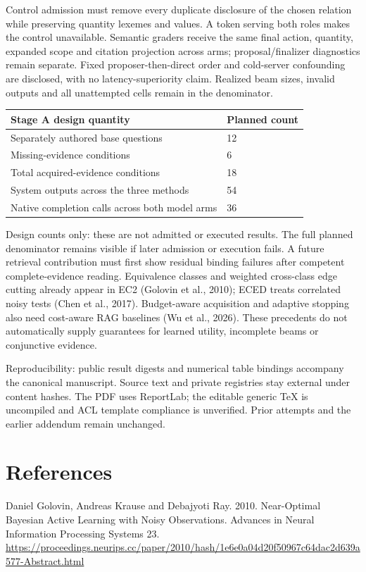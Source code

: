 \documentclass[10pt,a4paper]{article}
\begin{document}
Control admission must remove every duplicate disclosure of the chosen relation while preserving quantity lexemes and values. A token serving both roles makes the control unavailable. Semantic graders receive the same final action, quantity, expanded scope and citation projection across arms; proposal/finalizer diagnostics remain separate. Fixed proposer-then-direct order and cold-server confounding are disclosed, with no latency-superiority claim. Realized beam sizes, invalid outputs and all unattempted cells remain in the denominator.

\begin{longtable}{@{}p{}p{}@{}}\toprule
\textbf{Stage A design quantity} & \textbf{Planned count} \\ \midrule\endhead
Separately authored base questions & 12 \\
Missing-evidence conditions & 6 \\
Total acquired-evidence conditions & 18 \\
System outputs across the three methods & 54 \\
Native completion calls across both model arms & 36 \\
\bottomrule\end{longtable}
{\small Design counts only: these are not admitted or executed results. The full planned denominator remains visible if later admission or execution fails.}
A future retrieval contribution must first show residual binding failures after competent complete-evidence reading. Equivalence classes and weighted cross-class edge cutting already appear in EC2 (Golovin et al., 2010); ECED treats correlated noisy tests (Chen et al., 2017). Budget-aware acquisition and adaptive stopping also need cost-aware RAG baselines (Wu et al., 2026). These precedents do not automatically supply guarantees for learned utility, incomplete beams or conjunctive evidence.

Reproducibility: public result digests and numerical table bindings accompany the canonical manuscript. Source text and private registries stay external under content hashes. The PDF uses ReportLab; the editable generic TeX is uncompiled and ACL template compliance is unverified. Prior attempts and the earlier addendum remain unchanged.

\section*{References}
Daniel Golovin, Andreas Krause and Debajyoti Ray. 2010. Near-Optimal Bayesian Active Learning with Noisy Observations. Advances in Neural Information Processing Systems 23. \url{https://proceedings.neurips.cc/paper/2010/hash/1e6e0a04d20f50967c64dac2d639a577-Abstract.html}
\end{document}
